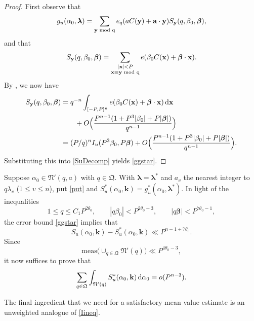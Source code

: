 \documentclass[12pt,reqno]{amsart}
\theoremstyle{definition}
\theoremstyle{remark}
\numberwithin{equation}{section}
\begin{document}
\begin{proof}
First observe that
\begin{equation} \label{SuDecomp}
g_u({{\alpha}}_0,{{\boldsymbol {{\lambda}}}}) = \sum_{{\mathbf y} {\,\,\rm{mod}\,\,q}} e_q(aC({\mathbf y})+ {\mathbf a} \cdot {\mathbf y}) S_{\mathbf y}(q,{{\beta}}_0,{\boldsymbol{\beta}}),
\end{equation}
and that
\[
S_{\mathbf y}(q,{{\beta}}_0,{\boldsymbol{\beta}}) = \sum_{\substack{|{\mathbf x}| < P \\ {\mathbf x} \equiv {\mathbf y} {\,\,\rm{mod}\,\,q}}} e({{\beta}}_0 C({\mathbf x}) + {\boldsymbol{\beta}} \cdot {\mathbf x}).
\]
By \cite[Lemma 8.1]{Bro2009}, we now have
\begin{align*}
S_{\mathbf y}(q,{{\beta}}_0,{\boldsymbol{\beta}}) &= q^{-n} \int_{[-P,P]^n} e({{\beta}}_0 C({\mathbf x}) + {\boldsymbol{\beta}} \cdot {\mathbf x}) {{\,{\rm d}}} {\mathbf x} \\
& \qquad + O\Bigl( \frac{P^{n-1} (1+P^3|{{\beta}}_0| + P|{\boldsymbol{\beta}}|)} {q^{n-1}}\Bigr) \\
&= (P/q)^n I_u(P^3{{\beta}}_0, P{\boldsymbol{\beta}}) + O\Bigl( \frac{P^{n-1} (1+P^3|{{\beta}}_0| + P|{\boldsymbol{\beta}}|)} {q^{n-1}}\Bigr).
\end{align*}
Substituting this into \eqref{SuDecomp} yields \eqref{ggstar}.
\end{proof}

Suppose ${{\alpha}}_0 \in {\mathfrak N}'(q,a)$ with $q \in {\mathfrak Q}$. With ${{\boldsymbol {{\lambda}}}} = {{\boldsymbol {{\lambda}}}}^*$ and $a_v$ the nearest integer to $q {{\lambda}}_v$ ($1 {\leqslant} v {\leqslant} n$), put \eqref{put} and $S_u^*({{\alpha}}_0, {\mathbf k}) = g_u^*({{\alpha}}_0, {{\boldsymbol {{\lambda}}}}^*)$. In light of the inequalities
\[
1 {\leqslant} q {\leqslant} C_1 P^{2 {{\theta}}_0}, \qquad |q {{\beta}}_0| < P^{2 {{\theta}}_0 - 3}, \qquad |q {\boldsymbol{\beta}}| < P^{7 {{\theta}}_0 - 1},
\]
the error bound \eqref{ggstar} implies that
\[
S_u({{\alpha}}_0,{\mathbf k}) - S_u^*({{\alpha}}_0,{\mathbf k}) \ll P^{n-1+7{{\theta}}_0}.
\]
Since
\[
{\mathrm{meas}} \bigl( \cup_{q \in {\mathfrak Q}} {\mathfrak N}'(q) \bigr) \ll P^{4 {{\theta}}_0 - 3},
\]
it now suffices to prove that
\begin{equation} \label{finalgoal}
\sum_{q \in {\mathfrak Q}} \int_{{\mathfrak N}'(q)} S_u^*({{\alpha}}_0, {\mathbf k}) {{\,{\rm d}}} {{\alpha}}_0 = o(P^{n-3}).
\end{equation}

The final ingredient that we need for a satisfactory mean value estimate is an unweighted analogue of \eqref{Iineq}.
\end{document}
